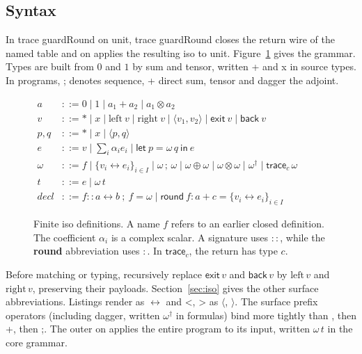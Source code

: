 \documentclass[acmsmall,screen,review,anonymous,nonacm]{acmart}
\newcommand{\storyinlinekwface}{\storyinlineface\bfseries}}
\newcommand{\storyinlineface}{\small\ttfamily}
\newcommand{\storyinlinekwface}{\small\ttfamily\bfseries}
\newcommand{\kw}[1]{\textnormal{\storyinlinekwface #1}}
\newcommand{\code}[1]{\textnormal{\storyinlineface #1}}
\numberwithin{equation}{section}
\begin{document}
\subsection{Syntax}
In \code{trace guardRound on unit}, \code{trace guardRound} closes
the return wire of the named table and \code{on} applies the resulting
iso to \code{unit}. Figure~\ref{fig:syntax} gives the grammar.
Types are built from $0$ and $1$ by sum and tensor, written \code{+} and \code{x} in source types.
In programs, \code{;} denotes sequence, \code{+} direct sum, \code{*}
tensor and \code{dagger} the adjoint.
\begin{figure}[!htbp]
\centering
\(\begin{aligned}
a &::= 0\mid 1\mid a_1+a_2\mid a_1\otimes a_2\\ v &::= *\mid
x\mid\mathrm{left}\ v\mid\mathrm{right}\ v
\mid\langle v_1,v_2\rangle
       \mid\mathsf{exit}\ v\mid\mathsf{back}\ v\\
p,q &::= *\mid x\mid\langle p,q\rangle\\ e &::= v\mid
{\textstyle\sum_i}\alpha_i e_i
       \mid\mathsf{let}\ p=\omega\,q\ \mathsf{in}\ e\\
 \omega &::= f\mid\{v_i\leftrightarrow e_i\}_{i\in I}
    \mid\omega\,;\,\omega\mid\omega\oplus\omega\mid\omega\otimes
\omega
    \mid\omega^\dagger\mid\mathsf{trace}_{c}\,\omega\\
t &::= e\mid\omega\,t\\
 \mathit{decl} &::= f\mathbin{::}a\leftrightarrow b\ ;\ f=\omega
     \mid \mathsf{round}\ f:a+c=\{v_i\leftrightarrow e_i\}_{i\in I}
\end{aligned}\)
\caption{Finite iso definitions. A name $f$ refers to an earlier
closed definition. The coefficient $\alpha_i$ is a complex scalar. A
signature uses $::$, while the \kw{round} abbreviation uses $:$. In $\mathsf{trace}_c$, the return has type $c$.}\label{fig:syntax}
\end{figure}
Before matching or typing, recursively replace $\mathsf{exit}\,v$ and
$\mathsf{back}\,v$ by $\mathrm{left}\,v$ and $\mathrm{right}\,v$, preserving
their payloads. Section~\ref{sec:iso} gives the other surface abbreviations.
Listings render \code{<->} as $\leftrightarrow$ and \code{<}, \code{>} as
$\langle$, $\rangle$. The surface prefix operators
(including \code{dagger}, written $\omega^\dagger$ in formulas) bind more tightly
than \code{*}, then \code{+}, then \code{;}. The outer \code{on} applies the entire
program to its input, written $\omega\,t$ in the core grammar.
\end{document}
